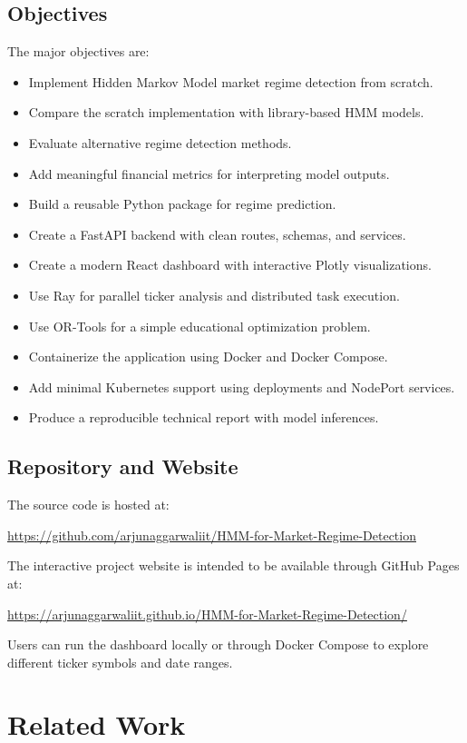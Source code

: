 \documentclass[12pt,a4paper]{report}
\begin{document}
\section{Objectives}
The major objectives are:
\begin{itemize}
    \item Implement Hidden Markov Model market regime detection from scratch.
    \item Compare the scratch implementation with library-based HMM models.
    \item Evaluate alternative regime detection methods.
    \item Add meaningful financial metrics for interpreting model outputs.
    \item Build a reusable Python package for regime prediction.
    \item Create a FastAPI backend with clean routes, schemas, and services.
    \item Create a modern React dashboard with interactive Plotly visualizations.
    \item Use Ray for parallel ticker analysis and distributed task execution.
    \item Use OR-Tools for a simple educational optimization problem.
    \item Containerize the application using Docker and Docker Compose.
    \item Add minimal Kubernetes support using deployments and NodePort services.
    \item Produce a reproducible technical report with model inferences.
\end{itemize}

\section{Repository and Website}
The source code is hosted at:
\begin{center}
\url{https://github.com/arjunaggarwaliit/HMM-for-Market-Regime-Detection}
\end{center}
The interactive project website is intended to be available through GitHub Pages at:
\begin{center}
\url{https://arjunaggarwaliit.github.io/HMM-for-Market-Regime-Detection/}
\end{center}
Users can run the dashboard locally or through Docker Compose to explore different ticker symbols and date ranges.

\chapter{Related Work}
\end{document}
